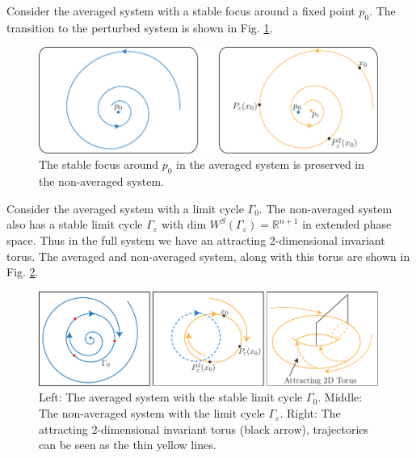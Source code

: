 \begin{ex}
	Consider the averaged system with a stable focus around a fixed point $p_0 $. The transition to the perturbed system is shown in Fig. \ref{fig:avg_ex_3a}.
	\begin{figure}[h!]
		\centering
		\includegraphics[width=0.99\textwidth]{figures/ch5/7avg_ex_3.pdf}
		\caption{The stable focus around $p_0$ in the averaged system is preserved in the non-averaged system.}
		\label{fig:avg_ex_3a}
	\end{figure}
	
\end{ex}
\begin{ex}
	Consider the averaged system with a limit cycle $\Gamma_0$. The non-averaged system also has a stable limit cycle $\Gamma_\varepsilon$ with $ \textrm{dim }W^{S}(\Gamma_\varepsilon) =\mathbb{R}^{n+1} $ in extended phase space. Thus in the full system we have an attracting 2-dimensional invariant torus. The averaged and non-averaged system, along with this torus are shown in Fig. \ref{fig:avg_ex_3}.
	\begin{figure}[h!]
		\centering
		\includegraphics[width=0.99\textwidth]{figures/ch5/8avg_ex_4.pdf}
		\caption{Left: The averaged system with the stable limit cycle $\Gamma_0$. Middle: The non-averaged system with the limit cycle $\Gamma_{\varepsilon}$. Right: The attracting 2-dimensional invariant torus (black arrow), trajectories can be seen as the thin yellow lines.}
		\label{fig:avg_ex_3}
	\end{figure}
	
\end{ex}


